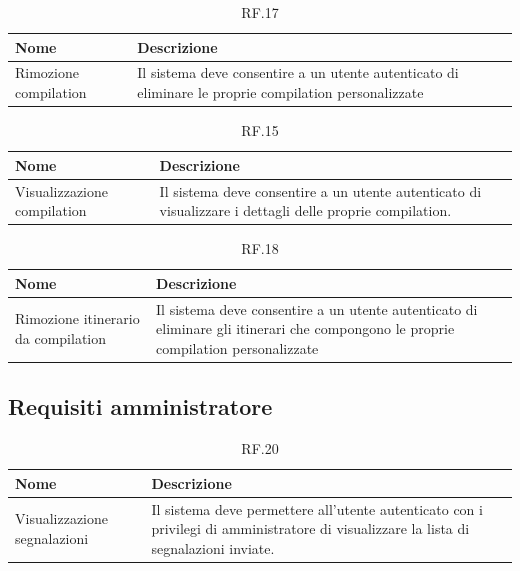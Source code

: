 \documentclass{natourDoc}
\begin{document}
	\begin{table}[H]
		\centering
		\begin{tabular}{ |p{5cm}|p{10.3cm}| }
			\hline
			\rowcolor{PineGreen!70}
			\textbf{Nome} & \textbf{Descrizione} \\
			\hline
			Rimozione compilation & Il sistema deve consentire a un utente autenticato di eliminare le proprie
			compilation personalizzate \\
			\hline
		\end{tabular}
		\caption{RF.17}
		\label{table:17}
	\end{table}

	\begin{table}[H]
		\centering
		\begin{tabular}{ |p{5cm}|p{10.3cm}| }
			\hline
			\rowcolor{PineGreen!70}
			\textbf{Nome} & \textbf{Descrizione} \\
			\hline
			Visualizzazione compilation & Il sistema deve consentire a un utente autenticato di visualizzare i dettagli
			delle proprie compilation.  \\
			\hline
		\end{tabular}
		\caption{RF.15}
		\label{table:15}
	\end{table}

	
	\begin{table}[H]
		\centering
		\begin{tabular}{ |p{5cm}|p{10.3cm}| }
			\hline
			\rowcolor{PineGreen!70}
			\textbf{Nome} & \textbf{Descrizione} \\
			\hline
			Rimozione itinerario da compilation & Il sistema deve consentire a un utente autenticato di eliminare gli itinerari
			che compongono le proprie compilation personalizzate \\
			\hline
		\end{tabular}
		\caption{RF.18}
		\label{table:18}
	\end{table}

	\subsection{Requisiti amministratore}
	\begin{table}[H]
		\centering
		\begin{tabular}{ |p{5cm}|p{10.3cm}| }
			\hline
			\rowcolor{PineGreen!70}
			\textbf{Nome} & \textbf{Descrizione} \\
			\hline
			Visualizzazione segnalazioni & Il sistema deve permettere all'utente autenticato con i privilegi di amministratore di visualizzare
			la lista di segnalazioni inviate.\\
			\hline
		\end{tabular}
		\caption{RF.20}
		\label{table:20}
	\end{table}
\end{document}
